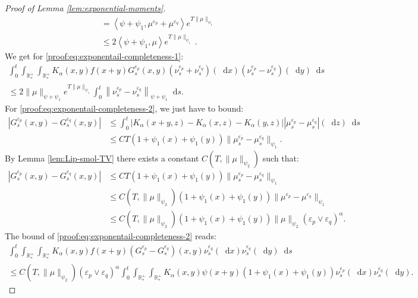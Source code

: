 \documentclass[11pt,a4paper]{article}
\newcommand{\RRP}{\mathbb{R}^+_*}
\newcommand{\brac}[1]{\left\langle#1\right\rangle}
\newcommand{\dd}{\mathop{}\!\mathrm{d}}
\begin{document}
\begin{proof}[Proof of Lemma \ref{lem:exponential-moments}]
\begin{align*}
        &= \brac{\psi + \psi_1, \mu^{\varepsilon_p} + \mu^{\varepsilon_q}}e^{T\|\mu\|_{\psi_1}} \\
        &\leq 2\brac{\psi + \psi_1, \mu}e^{T\|\mu\|_{\psi_1}}\ .
    \end{align*}
    We get for \eqref{proof:eq:exponentail-completeness-1}:
    \begin{multline*}
        \int_0^t \int_{\RRP}\int_{\RRP}K_\alpha(x,y)f(x+y) G^{\varepsilon_p}_s(x,y)(\nu_s^{\varepsilon_p} + \nu_s^{\varepsilon_q})(\dd x)(\nu_s^{\varepsilon_p} -\nu_s^{\varepsilon_q} )(\dd y)\dd s \\
        \leq 2\| \mu\|_{\psi + \psi_1}e^{T\|\mu\|_{\psi_1}} \int_0^t \left\|\nu_s^{\varepsilon_p} - \nu_s^{\varepsilon_q} \right\|_{\psi + \psi_1} \dd s.
    \end{multline*}
    For \eqref{proof:eq:exponentail-completeness-2}, we just have to bound:
    \begin{align*}
        \left| G^{\varepsilon_p}_s(x,y) - G^{\varepsilon_q}_s(x,y) \right| &\leq \int_0^t \left|K_\alpha(x+y,z) - K_\alpha(x,z) - K_\alpha(y,z)\right|\left|\mu_s^{\varepsilon_p} - \mu_s^{\varepsilon_q}\right|(\dd z) \dd s\\
        &\leq CT \left(1 + \psi_1(x) + \psi_1(y) \right)\| \mu_s^{\varepsilon_p} - \mu_s^{\varepsilon_q} \|_{\psi_1}.
    \end{align*}
    By Lemma \ref{lem:Lip-smol-TV} there exists a constant $ C\left(T,\|\mu\|_{\psi_2}\right)$ such that:
    \begin{align*}
        \left| G^{\varepsilon_p}_s(x,y) - G^{\varepsilon_q}_s(x,y) \right|
        &\leq CT \left(1 + \psi_1(x) + \psi_1(y) \right)\| \mu_s^{\varepsilon_p} - \mu_s^{\varepsilon_q} \|_{\psi_1}\\
        &\leq C\left(T,\|\mu\|_{\psi_2}\right) \left(1 + \psi_1(x) + \psi_1(y) \right)\| \mu^{\varepsilon_p} - \mu^{\varepsilon_q} \|_{\psi_1}\\
        &\leq C\left(T,\|\mu\|_{\psi_2}\right) \left(1 + \psi_1(x) + \psi_1(y) \right) \|\mu\|_{\psi_2} \left(\varepsilon_p \vee \varepsilon_q \right)^{\alpha}.
    \end{align*}
    The bound of \eqref{proof:eq:exponentail-completeness-2} reads:
    \begin{multline*}
        \int_0^t\int_{\RRP}\int_{\RRP}K_\alpha(x,y)f(x+y) (G^{\varepsilon_p}_s - G^{\varepsilon_q}_s)(x,y)\nu_s^{\varepsilon_q}(\dd x)\nu_s^{\varepsilon_q}(\dd y) \dd s \\
        \leq C\left(T,\|\mu\|_{\psi_2}\right)\left(\varepsilon_p \vee \varepsilon_q \right)^{\alpha} \int_0^t \int_{\RRP} \int_{\RRP} K_\alpha(x,y)\psi(x+y)\left(1 + \psi_1(x) + \psi_1(y) \right)\nu_s^{\varepsilon_p}(\dd x)\nu_s^{\varepsilon_q}(\dd y).

\end{multline*}
\end{proof}
\end{document}
